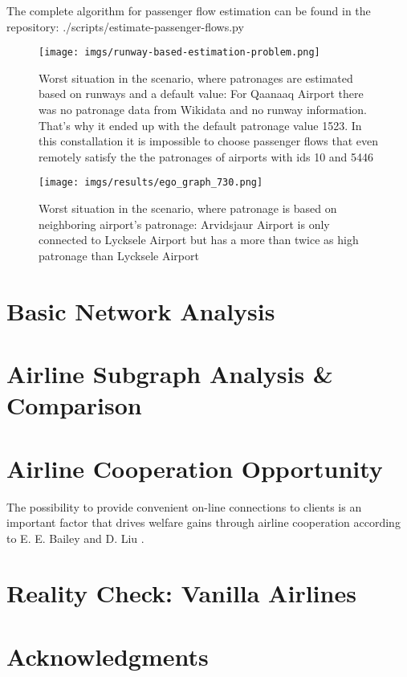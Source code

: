 \documentclass[twocolumn]{tum-article}
\begin{document}
The complete algorithm for passenger flow estimation can be found in the repository: ./scripts/estimate-passenger-flows.py

\begin{figure}[h]
	\centering
	\texttt{[image: imgs/runway-based-estimation-problem.png]}
	\caption{Worst situation in the scenario, where patronages are estimated based on runways and a default value: 
For Qaanaaq Airport there was no patronage data from Wikidata and no runway information. That's why it ended up with the default patronage value 1523. In this constallation it is impossible to choose passenger flows that even remotely satisfy the the patronages of airports with ids 10 and 5446}
	\label{fig:impossible_flows}
\end{figure}

\begin{figure}[h]

	\centering
	\texttt{[image: imgs/results/ego\_graph\_730.png]}
	\caption{Worst situation in the scenario, where patronage is based on neighboring airport's patronage: 
Arvidsjaur Airport is only connected to Lycksele Airport but has a more than twice as high patronage than Lycksele Airport}
	\label{fig:worst_flow_fit}
\end{figure}
\section{Basic Network Analysis}


\section{Airline Subgraph Analysis \& Comparison}


\section{Airline Cooperation Opportunity}

The possibility to provide convenient on-line connections to clients is an important factor that drives welfare gains through airline cooperation according to E. E. Bailey and D. Liu \cite{airline_consolidation_and_consumer_welfare}.

\section{Reality Check: Vanilla Airlines}


\section*{Acknowledgments}




\end{document}
